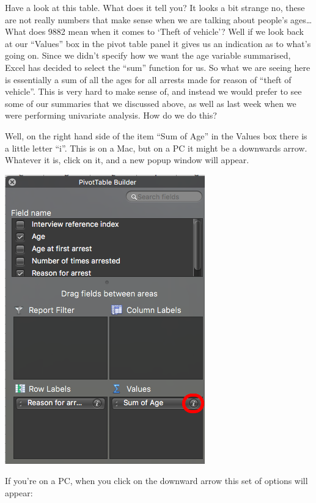 \documentclass[
]{book}
\begin{document}
Have a look at this table. What does it tell you? It looks a bit strange no, these are not really numbers that make sense when we are talking about people's ages\ldots{} What does 9882 mean when it comes to `Theft of vehicle'? Well if we look back at our ``Values'' box in the pivot table panel it gives us an indication as to what's going on. Since we didn't specify how we want the age variable summarised, Excel has decided to select the ``sum'' function for us. So what we are seeing here is essentially a sum of all the ages for all arrests made for reason of ``theft of vehicle''. This is very hard to make sense of, and instead we would prefer to see some of our summaries that we discussed above, as well as last week when we were performing univariate analysis. How do we do this?

Well, on the right hand side of the item ``Sum of Age'' in the Values box there is a little letter ``i''. This is on a Mac, but on a PC it might be a downwards arrow. Whatever it is, click on it, and a new popup window will appear.

\includegraphics{imgs/change_from_sum.png}

If you're on a PC, when you click on the downward arrow this set of options will appear:
\end{document}
